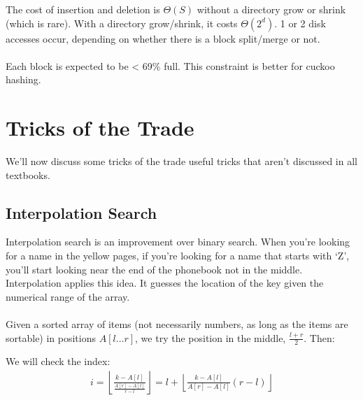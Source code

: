 \documentclass[]{article}
\theoremstyle{definition}
\begin{document}
			The cost of insertion and deletion is $\Theta(S)$ without a directory grow or shrink (which is rare). With a directory grow/shrink, it costs $\Theta(2^d)$. 1 or 2 disk accesses occur, depending on whether there is a block split/merge or not.
			\\ \\
			Each block is expected to be < 69\% full. This constraint is better for cuckoo hashing.
	
	\section{Tricks of the Trade}
		We'll now discuss some tricks of the trade \textendash{} useful tricks that aren't discussed in all textbooks.

		\subsection{Interpolation Search}
			Interpolation search is an improvement over binary search. When you're looking for a name in the yellow pages, if you're looking for a name that starts with `Z', you'll start looking near the end of the phonebook \textendash{} not in the middle. Interpolation applies this idea. It guesses the location of the key given the numerical range of the array.
			\\ \\
			Given a sorted array of items (not necessarily numbers, as long as the items are sortable) in positions $A[l \ldots r]$, we try the position in the middle, $\frac{l + r}{2}$. Then: \\
			\begin{algorithm}[H]
			\end{algorithm}

			We will check the index:
			\begin{align*}
				i = \left \lfloor \frac{k - A[l]}{\frac{A[r] - A[l]}{r - l}} \right \rfloor = l + \left \lfloor \frac{k - A[l]}{A[r] - A[l]} (r - l) \right \rfloor
			\end{align*}
\end{document}
